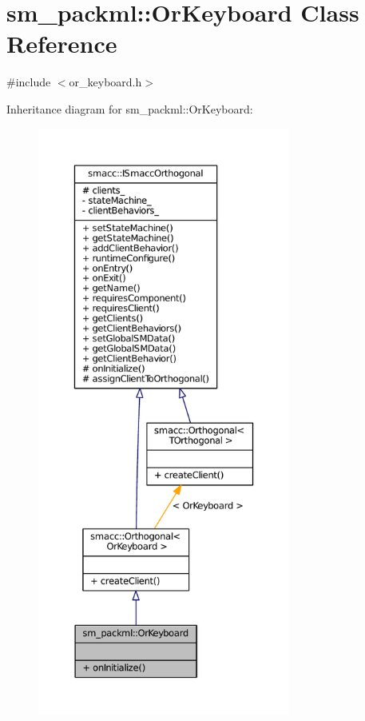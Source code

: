 \hypertarget{classsm__packml_1_1OrKeyboard}{}\section{sm\+\_\+packml\+:\+:Or\+Keyboard Class Reference}
\label{classsm__packml_1_1OrKeyboard}


{\ttfamily \#include $<$or\+\_\+keyboard.\+h$>$}



Inheritance diagram for sm\+\_\+packml\+:\+:Or\+Keyboard\+:
\nopagebreak
\begin{figure}[H]
\begin{center}
\leavevmode
\includegraphics[height=550pt]{classsm__packml_1_1OrKeyboard__inherit__graph}
\end{center}
\end{figure}


